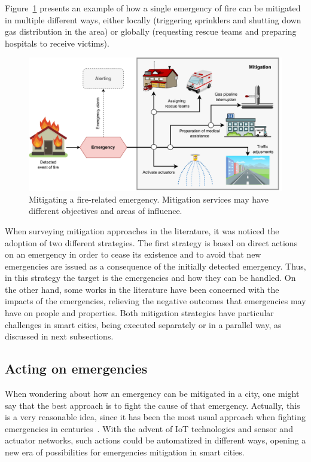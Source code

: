 \begin{refsection}
Figure~\ref{Fig:mitigation} presents an example of how a single emergency of fire can be mitigated in multiple different ways, either locally (triggering sprinklers and shutting down gas distribution in the area) or globally (requesting rescue teams and preparing hospitals to receive victims).

\begin{figure}[ht]
  \centering
  \includegraphics[scale=0.45]{Chapters/2-Survey/images/mitigation.pdf}
  \caption{Mitigating a fire-related emergency. Mitigation services may have different objectives and areas of influence.}\label{Fig:mitigation}
\end{figure}

When surveying mitigation approaches in the literature, it was noticed the adoption of two different strategies. The first strategy is based on direct actions on an emergency in order to cease its existence and to avoid that new emergencies are issued as a consequence of the initially detected emergency. Thus, in this strategy the target is the emergencies and how they can be handled. On the other hand, some works in the literature have been concerned with the impacts of the emergencies, relieving the negative outcomes that emergencies may have on people and properties. Both mitigation strategies have particular challenges in smart cities, being executed separately or in a parallel way, as discussed in next subsections. 

\subsection{Acting on emergencies}

When wondering about how an emergency can be mitigated in a city, one might say that the best approach is to fight the cause of that emergency. Actually, this is a very reasonable idea, since it has been the most usual approach when fighting emergencies in centuries~\cite{fireevolution,firetemporaldata1}. With the advent of IoT technologies and sensor and actuator networks, such actions could be automatized in different ways, opening a new era of possibilities for emergencies mitigation in smart cities. 


\end{refsection}

